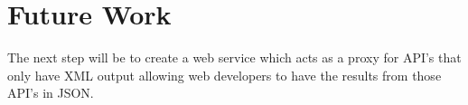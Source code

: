\documentclass[twocolumn,twoside,10pt,a4paper]{article}
\begin{document}
\section{Future Work}\label{sec:future-work}
The next step will be to create a web service which acts as a proxy for API's that only have XML output allowing web developers to have the results from those API's in JSON.



\renewcommand{\bibname}{References}


\end{document}
